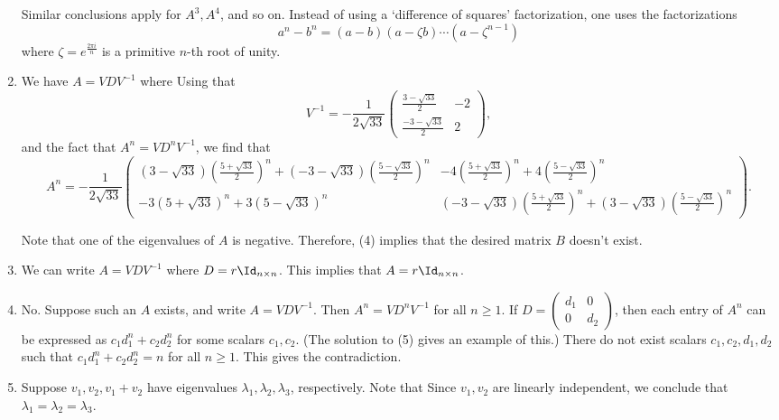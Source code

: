 \documentclass[10pt]{amsart}
\theoremstyle{mythm}
\theoremstyle{definition}
\theoremstyle{myrmk}
\begin{document}
\begin{enumerate}[label=(\arabic*)]
		Similar conclusions apply for $A^3, A^4$, and so on. Instead of using a `difference of squares' factorization, one uses the factorizations 
		\[
			a^n - b^n = (a-b)(a-\zeta b) \cdots (a - \zeta^{n-1})
		\]
		where $\zeta = e^{\frac{2\pi i}{n}}$ is a primitive $n$-th root of unity. 
		\item We have $A = VDV^{-1}$ where 
		Using that 
		\[
			V^{-1} = -\frac{1}{2\sqrt{33}} \begin{pmatrix}
				\frac{3 - \sqrt{33}}{2} & -2 \\
				\frac{-3-\sqrt{33}}{2} & 2
			\end{pmatrix}, 
		\]
		and the fact that $A^n = VD^nV^{-1}$, we find that 
		\[
			A^n = -\frac{1}{2\sqrt{33}} \begin{pmatrix}
				(3 - \sqrt{33}) (\tfrac{5 + \sqrt{33}}{2})^n  + (-3 - \sqrt{33})(\tfrac{5 - \sqrt{33}}{2})^n  & -4 (\tfrac{5 + \sqrt{33}}{2})^n + 4 (\tfrac{5 - \sqrt{33}}{2})^n  \\
				-3(5 + \sqrt{33})^n + 3(5 - \sqrt{33})^n & (-3 - \sqrt{33}) (\tfrac{5 + \sqrt{33}}{2})^n + (3 - \sqrt{33}) (\tfrac{5 - \sqrt{33}}{2})^n
			\end{pmatrix}. 
		\]
		
		Note that one of the eigenvalues of $A$ is negative. Therefore, (4) implies that the desired matrix $B$ doesn't exist. 
		\item We can write $A = VDV^{-1}$ where $D = r \Id_{n \times n}$. This implies that $A = r \Id_{n \times n}$. 
		\item No. Suppose such an $A$ exists, and write $A = VDV^{-1}$. Then $A^n = VD^n V^{-1}$ for all $n \ge 1$. If $D = \begin{pmatrix}
		d_1 & 0 \\ 0 & d_2
		\end{pmatrix}$, then each entry of $A^n$ can be expressed as $c_1 d_1^n + c_2 d_2^n$ for some scalars $c_1, c_2$. (The solution to (5) gives an example of this.) There do not exist scalars $c_1, c_2, d_1, d_2$ such that $c_1d_1^n + c_2 d_2^n = n$ for all $n \ge 1$. This gives the contradiction. 
		\item Suppose $v_1, v_2, v_1+v_2$ have eigenvalues $\lambda_1, \lambda_2, \lambda_3$, respectively. Note that 
		Since $v_1, v_2$ are linearly independent, we conclude that $\lambda_1 = \lambda_2 = \lambda_3$. 
	\end{enumerate}
	
	
	
	
	
\end{document}
